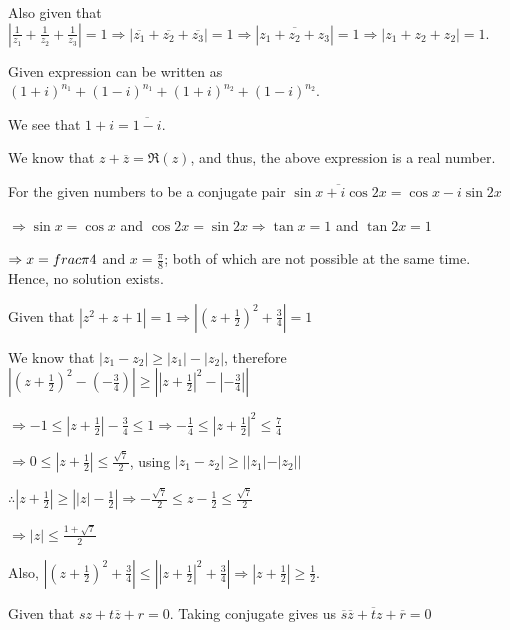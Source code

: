   Also given that $\left|\frac{1}{z_1} + \frac{1}{z_2} + \frac{1}{z_3}\right| = 1\Rightarrow |\overline{z_1}
  + \overline{z_2} + \overline{z_3}| = 1 \Rightarrow |\overline{z_1 + z_2 + z_3}| = 1\Rightarrow |z_1 + z_2 +
  z_2| = 1$.
\item Given expression can be written as $(1 + i)^{n_1} + (1 - i)^{n_1} + (1 + i)^{n_2} + (1 - i)^{n_2}$.

  We see that $1 + i = \overline{1 - i}$.

  We know that $z + \overline{z} = \Re(z)$, and thus, the above expression is a real number.
\item For the given numbers to be a conjugate pair $\overline{\sin x + i\cos2x} = \cos x -i\sin 2x$

  $\Rightarrow \sin x = \cos x$ and $\cos 2x = \sin 2x\Rightarrow \tan x = 1$ and $\tan 2x = 1$

  $\Rightarrow x = \\frac{\pi}{4}$ and $x = \frac{\pi}{8}$; both of which are not possible at the same
  time. Hence, no solution exists.
\item Given that $|z^2 + z + 1| = 1 \Rightarrow \left|\left(z + \frac{1}{2}\right)^2 + \frac{3}{4}\right| =
  1$

  We know that $|z_1 - z_2|\geq |z_1| - |z_2|$, therefore $\left|\left(z + \frac{1}{2}\right)^2
  -\left(-\frac{3}{4}\right)\right|\geq \left|\left|z + \frac{1}{2}\right|^2 -
  \left|-\frac{3}{4}\right|\right|$

  $\Rightarrow -1\leq \left|z + \frac{1}{2}\right| - \frac{3}{4}\leq 1 \Rightarrow -\frac{1}{4}\leq \left|z
  + \frac{1}{2}\right|^2\leq \frac{7}{4}$

  $\Rightarrow 0\leq \left|z + \frac{1}{2}\right|\leq \frac{\sqrt{7}}{2}$, using $|z_1 - z_2|\geq ||z_1| -
  |z_2||$

  $\therefore \left|z + \frac{1}{2}\right|\geq \left||z| - \frac{1}{2}\right|\Rightarrow
  -\frac{\sqrt{7}}{2}\leq z - \frac{1}{2}\leq \frac{\sqrt{7}}{2}$

  $\Rightarrow |z|\leq \frac{1 + \sqrt{7}}{2}$

  Also, $\left|\left(z + \frac{1}{2}\right)^2 + \frac{3}{4}\right|\leq \left|\left|z + \frac{1}{2}\right|^2
  + \frac{3}{4}\right|\Rightarrow \left|z + \frac{1}{2}\right|\geq \frac{1}{2}$.
\item Given that $sz + t\overline{z} + r = 0$. Taking conjugate gives us $\overline{s}\overline{z} +
  \overline{t}z + \overline{r} = 0$

